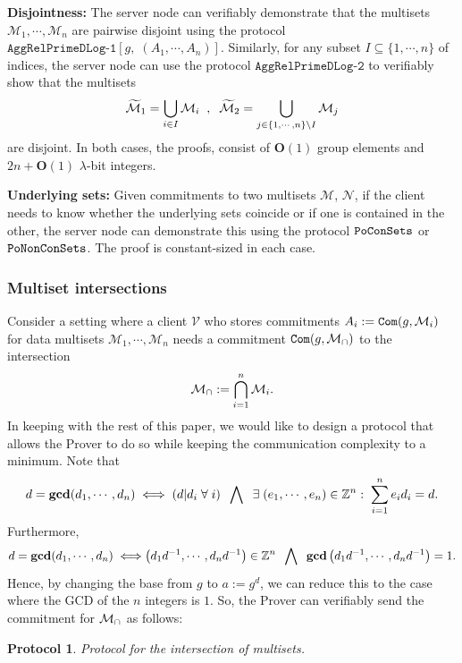 \documentclass[11pt, lettersize, notitlepage, leqno, footskip=0.6cm]{article}
\newcommand{\bz}{\mathbb Z}
\newcommand{\ttt}{\texttt}
\newcommand{\LRA}{\Longleftrightarrow}
\newcommand{\wti}{\widetilde}
\newcommand{\mc}{\mathcal}
\newcommand{\mbf}{\mathbf}
\newcommand{\sm}{\setminus}
\newcommand{\lam}{\lambda}
\newcommand{\sub}{\subseteq}
\newcommand{\bO}{\mbf{O}}
\newcommand{\mcM}{\mc{M}}
\newcommand{\vs}{\vspace{-0.15cm}}
\newcommand{\noin}{\noindent}
\newcommand{\GCD}{\mbf{gcd}}
\newtheorem{Prot}[Thm]{Protocol}
\numberwithin{equation}{section}
\begin{document}
\bigskip


\noin \textbf{Disjointness:} The server node can verifiably demonstrate that the multisets $\mcM_1,\cdots,\mcM_n$ are pairwise disjoint using the protocol $\ttt{AggRelPrimeDLog-1}[g,\;(A_1,\cdots,A_n)]$. Similarly, for any subset $I\sub\{1,\cdots,n \}$ of indices, the server node can use the protocol $\ttt{AggRelPrimeDLog-2}$ to verifiably show that the multisets \vs $$\wti{\mcM}_1 = \bigcup\limits_{i\in I}\mcM_i\;\;,\;\;\wti{\mcM}_2 = \bigcup\limits_{j\in \{1,\cdots,n\}\sm I}\mcM_j \vs $$ are disjoint. In both cases, the proofs, consist of $\bO(1)$ group elements and $2n+\bO(1)$ $\lam$-bit integers.

\bigskip

\noin \textbf{Underlying sets:} Given commitments to two multisets $\mc{M}$, $\mc{N}$, if the client needs to know whether the underlying sets coincide or if one is contained in the other, the server  node can demonstrate this using the protocol $\tt{PoConSets}$ or  $\tt{PoNonConSets}$. The proof is constant-sized in each case.

\subsubsection{\fontsize{11}{11}\selectfont Multiset intersections }

\noin Consider a setting where a client $\mc{V}$ who stores commitments $A_i:= \protect{\ttt{Com}}(g, \mc{M}_i)$ for data multisets $\mc{M}_1, \cdots, \mc{M}_n$ needs a commitment $\protect{\verb|Com|}(g, \mc{M}_{\tt{\cap}})$ to the intersection \vs $$\mc{M}_{\tt{\cap}}:=\bigcap\limits_{i=1}^n \mc{M}_i .\vs $$ In keeping with the rest of this paper, we would like to design a protocol that allows the Prover to do so while keeping the communication complexity to a minimum. Note that \vs $$d = \GCD(d_1,\cdots,d_n)\; \LRA\; (d|d_i\;\forall\;i)\;\;\bigwedge\;\; \exists\;(e_1,\cdots,e_n)\in\bz^n:\;\sum_{i=1}^n e_id_i = d . \vs $$ Furthermore, \vs $$d = \GCD(d_1,\cdots,d_n)\; \LRA \left({d_1}{d}^{-1},\cdots, {d_n}{d}^{-1}\right)\in \bz^n\;\;\bigwedge\;\; \GCD\left({d_1}{d}^{-1},\cdots, {d_n}{d}^{-1}\right)=1. \vs $$ Hence, by changing the base from $g$ to $a:= g^d$, we can reduce this to the case where the GCD of the $n$ integers is $1$. So, the Prover can verifiably send the commitment for $\mc{M}_{\tt{\cap}}$ as follows: \vspace{0.1cm}


\begin{Prot} Protocol for the intersection of multisets.\end{Prot} \vspace{-0.3cm}
\end{document}
